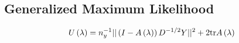 \documentclass[12pt]{article}
\theoremstyle{definition}
\begin{document}
\subsection{Generalized Maximum Likelihood}
\[
U\left(\lambda\right) = n_y^{-1} \vert \vert \left( I - A\left(\lambda\right)\right)D^{-1/2} Y\vert \vert^2 + 2\textup{tr}A\left(\lambda\right)
\]




























\end{document}
